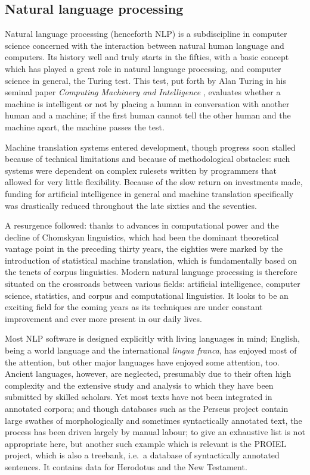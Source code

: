 \subsection{Natural language processing} 

Natural language processing (henceforth NLP) is a subdiscipline in computer
science concerned with the interaction between natural human language and
computers. Its history well and truly starts in the fifties, with a basic
concept which has played a great role in natural language processing, and
computer science in general, the Turing test. This test, put forth by Alan
Turing in his seminal paper \textit{Computing Machinery and Intelligence}
\citep{turing1950}, evaluates whether a machine is intelligent or not by
placing a human in conversation with another human and a machine; if the first
human cannot tell the other human and the machine apart, the machine passes the test.

Machine translation systems entered development, though progress soon stalled
because of technical limitations and because of methodological obstacles: such
systems were dependent on complex rulesets written by programmers that allowed
for very little flexibility. Because of the slow return on investments made,
funding for artificial intelligence in general and machine translation
specifically was drastically reduced throughout the late sixties and the seventies.

A resurgence followed: thanks to advances in computational power and the
decline of Chomskyan linguistics, which had been the dominant theoretical
vantage point in the preceding thirty years, the eighties were marked by the
introduction of statistical machine translation, which is fundamentally based
on the tenets of corpus linguistics. Modern natural language processing is
therefore situated on the crossroads between various fields: artificial
intelligence, computer science, statistics, and corpus and computational
linguistics. It looks to be an exciting field for the coming years as its
techniques are under constant improvement and ever more present in our daily lives.

Most NLP software is designed explicitly with living languages in mind;
English, being a world language and the international \textit{lingua franca},
has enjoyed most of the attention, but other major languages have enjoyed some
attention, too. Ancient languages, however, are neglected, presumably due to
their often high complexity and the extensive study and analysis to which they
have been submitted by skilled scholars. Yet most texts have not been
integrated in annotated corpora; and though databases such as the Perseus
project contain large swathes of morphologically and sometimes syntactically
annotated text, the process has been driven largely by manual labour; to give
an exhaustive list is not appropriate here, but another such example which is
relevant is the PROIEL project, which is also a treebank, i.e.\ a database of
syntactically annotated sentences. It contains data for Herodotus and the New Testament.

